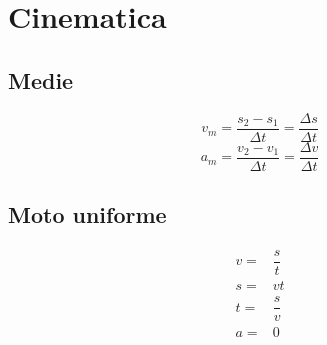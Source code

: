 \chapter{Cinematica}
\section{Medie}
\begin{equation*}
v_m=\dfrac{s_2-s_1}{\Delta t}=\dfrac{\Delta s}{\Delta t}
\end{equation*}
\begin{equation*}
a_m=\dfrac{v_2-v_1}{\Delta t}=\dfrac{\Delta v}{\Delta t}
\end{equation*}
\section{Moto uniforme}
\begin{align*}
v=&\dfrac{s}{t}\\
s=&vt\\
t=&\dfrac{s}{v}\\
a=&0
\end{align*}